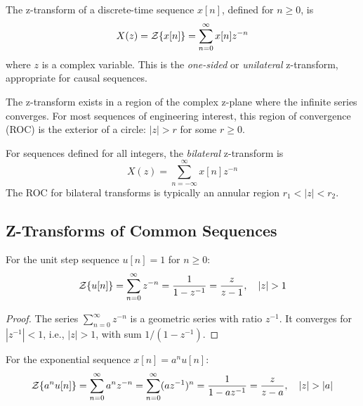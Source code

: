 \begin{definition}[Z-Transform]
The z-transform of a discrete-time sequence $x[n]$, defined for $n \geq 0$, is
\begin{equation}
X(z) = \mathcal{Z}\{x[n]\} = \sum_{n=0}^{\infty} x[n] z^{-n}
\end{equation}
where $z$ is a complex variable. This is the \emph{one-sided} or \emph{unilateral} z-transform, appropriate for causal sequences.
\end{definition}

The z-transform exists in a region of the complex z-plane where the infinite series converges. For most sequences of engineering interest, this region of convergence (ROC) is the exterior of a circle: $|z| > r$ for some $r \geq 0$.

\begin{definition}
For sequences defined for all integers, the \emph{bilateral} z-transform is
\begin{equation}
X(z) = \sum_{n=-\infty}^{\infty} x[n] z^{-n}
\end{equation}
The ROC for bilateral transforms is typically an annular region $r_1 < |z| < r_2$.
\end{definition}

\subsection{Z-Transforms of Common Sequences}

\begin{theorem}
For the unit step sequence $u[n] = 1$ for $n \geq 0$:
\begin{equation}
\mathcal{Z}\{u[n]\} = \sum_{n=0}^{\infty} z^{-n} = \frac{1}{1 - z^{-1}} = \frac{z}{z-1}, \quad |z| > 1
\end{equation}
\end{theorem}

\begin{proof}
The series $\sum_{n=0}^{\infty} z^{-n}$ is a geometric series with ratio $z^{-1}$. It converges for $|z^{-1}| < 1$, i.e., $|z| > 1$, with sum $1/(1-z^{-1})$.
\end{proof}

\begin{theorem}
For the exponential sequence $x[n] = a^n u[n]$:
\begin{equation}
\mathcal{Z}\{a^n u[n]\} = \sum_{n=0}^{\infty} a^n z^{-n} = \sum_{n=0}^{\infty} (az^{-1})^n = \frac{1}{1 - az^{-1}} = \frac{z}{z-a}, \quad |z| > |a|
\end{equation}
\end{theorem}

